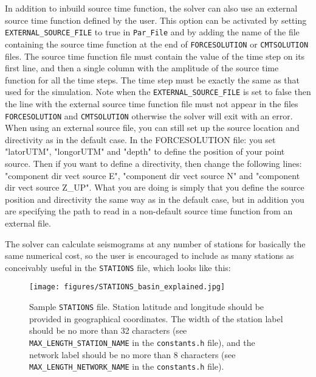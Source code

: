 \vspace{1cm}

In addition to inbuild source time function, the solver can also use an external source time function defined by the user. This option can be
activated by setting   \texttt{EXTERNAL\_SOURCE\_FILE} to true in \texttt{Par\_File} and by adding the name of the file
containing the source time function at the end of \texttt{FORCESOLUTION} or \texttt{CMTSOLUTION} files.
The source time function file must contain the value of the time step on its first line, and then a single column with the amplitude of the source time function for all the time steps.
The time step must be exactly the same as that used for the simulation.
Note  when the  \texttt{EXTERNAL\_SOURCE\_FILE} is set to false then the line with the external source time function file must not appear in
the files  \texttt{FORCESOLUTION} and \texttt{CMTSOLUTION} otherwise the solver will exit with an error.
When using an external source file, you can still set up the source location and directivity as in the default case.
In the FORCESOLUTION file: you set "latorUTM", "longorUTM" and "depth" to define the position of your point source. Then if you want to define a directivity, then change the following lines: "component dir vect source E", "component dir vect source N" and "component dir vect source Z\_UP". What you are doing is simply that you define the source position and directivity the same way as in the default case, but in addition you are specifying the path to read in a non-default source time function from an external file.

\vspace{1cm}

The solver can calculate seismograms at any number of stations for
basically the same numerical cost, so the user is encouraged to include
as many stations as conceivably useful in the \texttt{STATIONS} file,
which looks like this:
%
\begin{figure}[H]
\begin{centering}
\texttt{[image: figures/STATIONS\_basin\_explained.jpg]}
\par
\end{centering}
\caption{Sample \texttt{STATIONS} file. Station latitude and longitude should
be provided in geographical coordinates. The width of the station
label should be no more than 32 characters (see \texttt{MAX\_LENGTH\_STATION\_NAME}
in the \texttt{constants.h} file), and the network label should be
no more than 8 characters (see \texttt{MAX\_LENGTH\_NETWORK\_NAME}
in the \texttt{constants.h} file).}
\label{fig:Sample-STATIONS-file.}
\end{figure}



